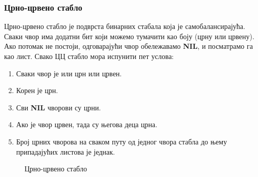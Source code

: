 \documentclass[11pt, oneside, a4paper]{article}
\begin{document}
\subsubsection*{Црно-црвено стабло}
Црно-црвено стабло је подврста бинарних стабала која је самобалансирајућа. Сваки чвор има додатни бит који можемо тумачити као боју (црну или црвену). Ако потомак не постоји, одговарајући чвор обележавамо \textbf{NIL}, и посматрамо га као лист. Свако ЦЦ стабло мора испунити пет услова:
\begin{enumerate}
\item Сваки чвор је или црн или црвен.
\item Корен је црн.
\item Сви \textbf{NIL} чворови су црни.
\item Ако је чвор црвен, тада су његова деца црна.
\item Број црних чворова на сваком путу од једног чвора стабла до њему припадајућих листова је једнак.
\end{enumerate}
\begin{figure}[h]
    \centering


\caption{Црно-црвено стабло}
\end{figure}
\end{document}
